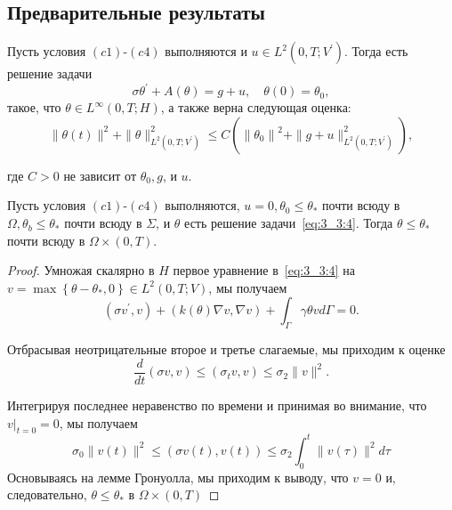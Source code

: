 \subsection{Предварительные результаты}\label{subsec:ch3:sec3:subsec3}

\begin{lemma}
    \label{lm:3_3:1}
    Пусть условия $(c1)$-$(c4)$ выполняются и $u \in L^{2}\left(0, T ; V^{\prime}\right)$.
    Тогда есть решение задачи
    \begin{equation}
        \label{eq:3_3:4}
        \sigma \theta^{\prime}+A(\theta)=g+u, \quad \theta(0)=\theta_{0},
    \end{equation}
    такое, что $\theta \in L^{\infty}(0, T ; H)$, а также верна следующая оценка:
    \[
        \|\theta(t)\|^{2}+\|\theta\|_{L^{2}\left(0, T ; V^{\prime}\right)}^{2}
        \leq C\left(\left\|\theta_{0}\right\|^{2}+\|g+u\|_{L^{2}
        \left(0, T; V^{\prime}\right)}^{2}\right),
    \]

    где $C>0$ не зависит от $\theta_{0}, g$, и $u$.
\end{lemma}

\begin{lemma}
    \label{lm:3_3:2}
    Пусть условия $(c1)$-$(c4)$ выполняются, $u=0, \theta_{0} \leq \theta_{*}$ почти всюду
    в $\Omega, \theta_{b} \leq \theta_{*}$ почти всюду в $\Sigma$, и $\theta$ есть
    решение задачи~\eqref{eq:3_3:4}.
    Тогда $\theta \leq \theta_{*}$ почти всюду в $\Omega \times(0, T)$.
\end{lemma}

\begin{proof}
    Умножая скалярно в $H$ первое уравнение в~\eqref{eq:3_3:4} на
    $v=\max \left\{\theta-\theta_{*}, 0\right\}\in L^{2}(0, T; V)$, мы получаем
    \[
        \left(\sigma v^{\prime}, v\right)+(k(\theta) \nabla v, \nabla v)
        + \int_{\Gamma} \gamma \theta v d \Gamma=0.
    \]

    Отбрасывая неотрицательные второе и третье слагаемые, мы приходим к оценке
    \[
        \frac{d}{d t}(\sigma v, v) \leq\left(\sigma_{t} v, v\right) \leq \sigma_{2}\|v\|^{2}.
    \]

    Интегрируя последнее неравенство по времени и принимая во внимание,
    что $\left.v\right|_{t=0}=0$, мы получаем
    \[
        \sigma_{0}\|v(t)\|^{2} \leq(\sigma v(t), v(t))
        \leq \sigma_{2} \int_{0}^{t}\|v(\tau)\|^{2} d \tau
    \]
    Основываясь на лемме Гронуолла, мы приходим к выводу, что $v=0$ и, следовательно,
    $\theta \leq \theta_{*}$ в $\Omega \times(0, T)$
\end{proof}

